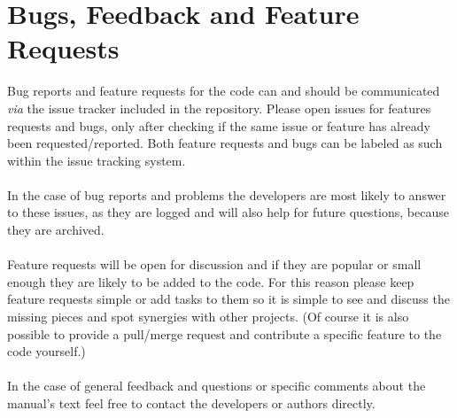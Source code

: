 \chapter{Bugs, Feedback and Feature Requests}
Bug reports and feature requests for the \serenity code can and should be communicated \textit{via} the issue tracker included in the
repository. Please open issues for features requests and bugs, only after checking if the same issue or feature has already been requested/reported.
Both feature requests and bugs can be labeled as such within the issue tracking system.\\
\\
In the case of bug reports and problems the developers are most likely to answer to these issues, as they are logged and will also help for future questions, because they
are archived. \\
\\
Feature requests will be open for discussion and if they are popular or small enough they are likely to be added to the code.
For this reason please keep feature requests simple or add tasks to them so it is simple to see and discuss the missing pieces and spot
synergies with other projects.
(Of course it is also possible to provide a pull/merge request and contribute a specific feature to the code yourself.)\\
\\
In the case of general feedback and questions or specific comments about the manual's text feel free to contact the developers or authors directly.